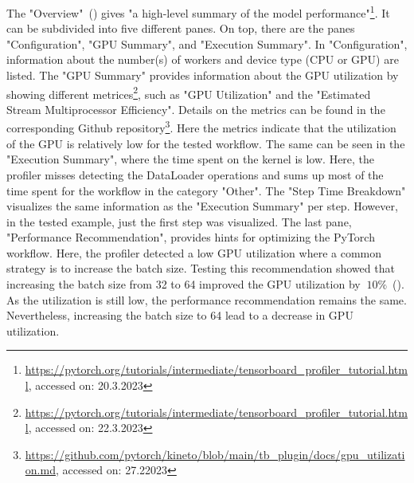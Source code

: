 \documentclass[12pt, a4paper, hidelinks]{article}
\begin{document}
The "Overview"~() gives "a high-level summary of the model performance"\footnote{\url{https://pytorch.org/tutorials/intermediate/tensorboard_profiler_tutorial.html}, accessed on: 20.3.2023}. It can be subdivided into five different panes. On top, there are the panes "Configuration", "GPU Summary", and "Execution Summary". In "Configuration", information about the number(s) of workers and device type (\ac{CPU} or \ac{GPU}) are listed. The "GPU Summary" provides information about the GPU utilization by showing different metrices\footnote{\url{https://pytorch.org/tutorials/intermediate/tensorboard_profiler_tutorial.html}, accessed on: 22.3.2023}, such as "GPU Utilization" and the "Estimated Stream Multiprocessor Efficiency". Details on the metrics can be found in the corresponding Github repository\footnote{\url{https://github.com/pytorch/kineto/blob/main/tb_plugin/docs/gpu_utilization.md}, accessed on: 27.22023}. Here the metrics indicate that the utilization of the GPU is relatively low for the tested workflow. The same can be seen in the "Execution Summary", where the time spent on the kernel is low. Here, the profiler misses detecting the DataLoader operations and sums up most of the time spent for the workflow in the category "Other". The "Step Time Breakdown" visualizes the same information as the "Execution Summary" per step. However, in the tested example, just the first step was visualized. The last pane, "Performance Recommendation", provides hints for optimizing the PyTorch workflow. Here, the profiler detected a low \ac{GPU} utilization where a common strategy is to increase the batch size. Testing this recommendation showed that increasing the batch size from 32 to 64 improved the GPU utilization by $~10\%$~(). As the utilization is still low, the performance recommendation remains the same. Nevertheless, increasing the batch size to 64 lead to a decrease in GPU utilization.
\end{document}
